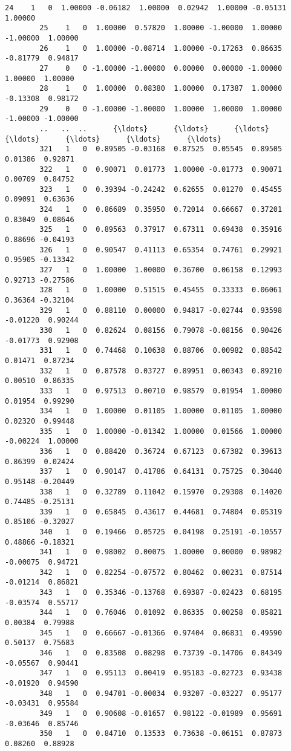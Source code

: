 \documentclass[11pt]{article}
\begin{document}
\begin{Verbatim}[commandchars=\\\{\}]
        24    1   0  1.00000 -0.06182  1.00000  0.02942  1.00000 -0.05131  1.00000   
        25    1   0  1.00000  0.57820  1.00000 -1.00000  1.00000 -1.00000  1.00000   
        26    1   0  1.00000 -0.08714  1.00000 -0.17263  0.86635 -0.81779  0.94817   
        27    0   0 -1.00000 -1.00000  0.00000  0.00000 -1.00000  1.00000  1.00000   
        28    1   0  1.00000  0.08380  1.00000  0.17387  1.00000 -0.13308  0.98172   
        29    0   0 -1.00000 -1.00000  1.00000  1.00000  1.00000 -1.00000 -1.00000   
        ..   ..  ..      {\ldots}      {\ldots}      {\ldots}      {\ldots}      {\ldots}      {\ldots}      {\ldots}   
        321   1   0  0.89505 -0.03168  0.87525  0.05545  0.89505  0.01386  0.92871   
        322   1   0  0.90071  0.01773  1.00000 -0.01773  0.90071  0.00709  0.84752   
        323   1   0  0.39394 -0.24242  0.62655  0.01270  0.45455  0.09091  0.63636   
        324   1   0  0.86689  0.35950  0.72014  0.66667  0.37201  0.83049  0.08646   
        325   1   0  0.89563  0.37917  0.67311  0.69438  0.35916  0.88696 -0.04193   
        326   1   0  0.90547  0.41113  0.65354  0.74761  0.29921  0.95905 -0.13342   
        327   1   0  1.00000  1.00000  0.36700  0.06158  0.12993  0.92713 -0.27586   
        328   1   0  1.00000  0.51515  0.45455  0.33333  0.06061  0.36364 -0.32104   
        329   1   0  0.88110  0.00000  0.94817 -0.02744  0.93598 -0.01220  0.90244   
        330   1   0  0.82624  0.08156  0.79078 -0.08156  0.90426 -0.01773  0.92908   
        331   1   0  0.74468  0.10638  0.88706  0.00982  0.88542  0.01471  0.87234   
        332   1   0  0.87578  0.03727  0.89951  0.00343  0.89210  0.00510  0.86335   
        333   1   0  0.97513  0.00710  0.98579  0.01954  1.00000  0.01954  0.99290   
        334   1   0  1.00000  0.01105  1.00000  0.01105  1.00000  0.02320  0.99448   
        335   1   0  1.00000 -0.01342  1.00000  0.01566  1.00000 -0.00224  1.00000   
        336   1   0  0.88420  0.36724  0.67123  0.67382  0.39613  0.86399  0.02424   
        337   1   0  0.90147  0.41786  0.64131  0.75725  0.30440  0.95148 -0.20449   
        338   1   0  0.32789  0.11042  0.15970  0.29308  0.14020  0.74485 -0.25131   
        339   1   0  0.65845  0.43617  0.44681  0.74804  0.05319  0.85106 -0.32027   
        340   1   0  0.19466  0.05725  0.04198  0.25191 -0.10557  0.48866 -0.18321   
        341   1   0  0.98002  0.00075  1.00000  0.00000  0.98982 -0.00075  0.94721   
        342   1   0  0.82254 -0.07572  0.80462  0.00231  0.87514 -0.01214  0.86821   
        343   1   0  0.35346 -0.13768  0.69387 -0.02423  0.68195 -0.03574  0.55717   
        344   1   0  0.76046  0.01092  0.86335  0.00258  0.85821  0.00384  0.79988   
        345   1   0  0.66667 -0.01366  0.97404  0.06831  0.49590  0.50137  0.75683   
        346   1   0  0.83508  0.08298  0.73739 -0.14706  0.84349 -0.05567  0.90441   
        347   1   0  0.95113  0.00419  0.95183 -0.02723  0.93438 -0.01920  0.94590   
        348   1   0  0.94701 -0.00034  0.93207 -0.03227  0.95177 -0.03431  0.95584   
        349   1   0  0.90608 -0.01657  0.98122 -0.01989  0.95691 -0.03646  0.85746   
        350   1   0  0.84710  0.13533  0.73638 -0.06151  0.87873  0.08260  0.88928   
        

\end{Verbatim}
\end{document}
